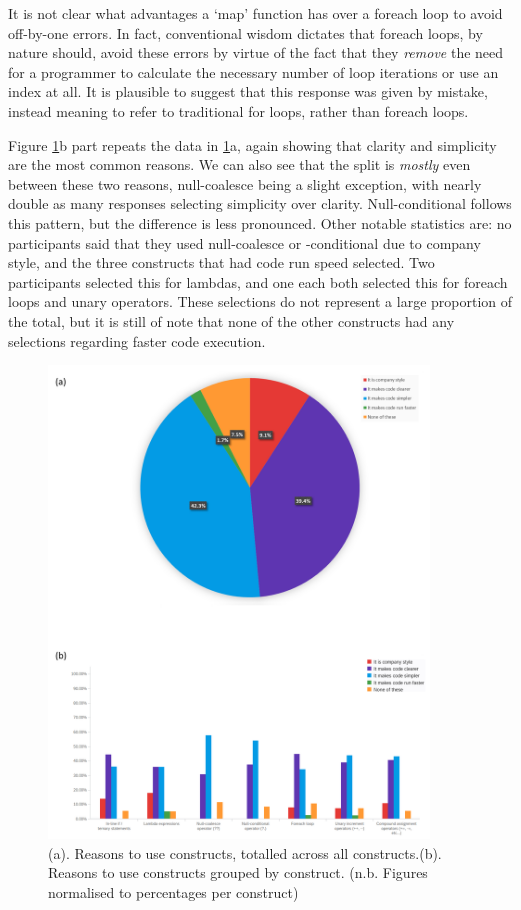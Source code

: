 \documentclass{article}
\begin{document}
            It is not clear what advantages a `map' function has over a foreach loop to avoid off-by-one errors. In fact, conventional wisdom dictates that foreach loops, by nature should, avoid these errors by virtue of the fact that they \emph{remove} the need for a programmer to calculate the necessary number of loop iterations or use an index at all. It is plausible to suggest that this response was given by mistake, instead meaning to refer to traditional for loops, rather than foreach loops.

            Figure \ref{fig:toUse}b part repeats the data in \ref{fig:toUse}a, again showing that clarity and simplicity are the most common reasons. We can also see that the split is \emph{mostly} even between these two reasons, null-coalesce being a slight exception, with nearly double as many responses selecting simplicity over clarity. Null-conditional follows this pattern, but the difference is less pronounced.
            Other notable statistics are: no participants said that they used null-coalesce or -conditional due to company style, and the three constructs that had code run speed selected. Two participants selected this for lambdas, and one each both selected this for foreach loops and unary operators. These selections do not represent a large proportion of the total, but it is still of note that none of the other constructs had any selections regarding faster code execution.
            
            \begin{figure}[htbp]
                \centering
                \includegraphics[width=0.9\textwidth]{toUse}
                \caption{(a). Reasons to use constructs, totalled across all constructs.\newline (b). Reasons to use constructs grouped by construct. (n.b. Figures normalised to percentages per construct)}
                \label{fig:toUse}
            \end{figure}
\end{document}
